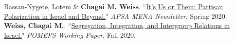 \documentclass[11pt]{article}
\begin{document}
 Bassan-Nygete, Lotem \& \textbf{Chagai M. Weiss}. ``\href{https://apsamena.org/2020/11/19/its-us-or-them-partisan-polarization-in-israel-and-beyond/}{It's Us or Them: Partisan Polarization in Israel and Beyond.}" \textit{APSA MENA Newsletter}, Spring 2020.\\ 
 
 \textbf{Weiss, Chagai M.}. ``\href{https://pomeps.org/segregation-integration-and-intergroup-relations-in-israel}{Segregation, Integration, and Intergroup Relations in Israel.}" \emph{POMEPS Working Paper}, Fall 2020. 
 
\end{document}
